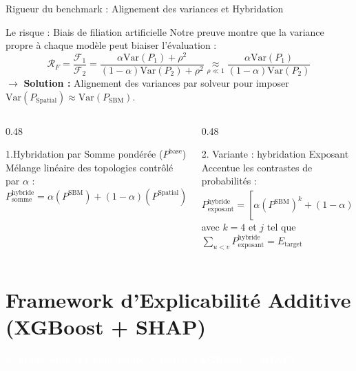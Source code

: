 \documentclass[10pt]{beamer}
\begin{document}
\begin{frame}{Rigueur du benchmark : Alignement des variances et Hybridation}

    \begin{block}{Le risque : Biais de filiation artificielle}
        \small
        Notre preuve montre que la variance propre à chaque modèle peut biaiser l'évaluation :
        $$ \mathcal{R}_F = \frac{\mathcal{F}_1}{\mathcal{F}_2} = \frac{\alpha \text{Var}(P_1) + \rho^2}{(1-\alpha) \text{Var}(P_2) + \rho^2} \underset{\rho \ll 1}{\approx} \frac{\alpha \text{Var}(P_1)}{(1-\alpha) \text{Var}(P_2)} $$
        \footnotesize
        $\rightarrow$ \textbf{Solution :} Alignement des variances par solveur pour imposer $\text{Var}(P_{\text{Spatial}}) \approx  \text{Var}(P_{\text{SBM}})$.
    \end{block}

    \vspace{-0.1cm}

    \begin{columns}[t]
        \begin{column}{0.48\textwidth}
            \begin{exampleblock}{\small 1.Hybridation par Somme pondérée ($P^{\text{base}}$)}
                \scriptsize
                Mélange linéaire des topologies contrôlé par $\alpha$ :
                $$ P^{\text{hybride}}_{\text{somme}} = \alpha (P^{\text{SBM}}) + (1-\alpha) (P^{\text{Spatial}}) $$
            \end{exampleblock}
        \end{column}
        
        \begin{column}{0.48\textwidth}
            \begin{alertblock}{\small 2. Variante : hybridation Exposant}
                \scriptsize
                Accentue les contrastes de probabilités :
                $$ P^{\text{hybride}}_{\text{exposant}} = [\alpha (P^{\text{SBM}})^k + (1-\alpha) (P^{\text{Spatial}})^k]^ j $$
                avec $k=4$ et $j$ tel que $\sum_{u < v} P^{\text{hybride}}_{\text{exposant}} = E_{\text{target}}$
            \end{alertblock}
        \end{column}     
    \end{columns}
\end{frame}


\section{Framework d'Explicabilité Additive (XGBoost + SHAP)}
{
\begin{frame}[plain] %
    \centering
    \vfill
    \Huge \bfseries \textcolor{white}{3. Framework d'Explicabilité Additive (XGBoost + SHAP)}
    \vfill
\end{frame}
}
\end{document}
